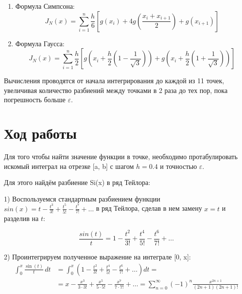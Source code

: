 \documentclass[a4paper,12pt]{article}
\begin{document}
{\begin{enumerate}
{\begin{enumerate}
{\begin{equation}
                \end{equation}
                }
            \item {
                Формула Симпсона:
                \begin{equation}
                    J_N(x) = \displaystyle\sum_{i=1}^{n}\displaystyle\frac{h}{6} \left[g(x_i)+4g\left(
                        \displaystyle\frac{x_i + x_{i+1}}{2}
                    \right) + g(x_{i+1}) \right]
                \end{equation}
                }
            \item {
                Формула Гаусса:
                \begin{equation}
                    J_N(x) = \displaystyle\sum_{i=1}^{n}\displaystyle\frac{h}{2} \left[g\left(
                        x_i + \displaystyle\frac{h}{2}\left(1 - \displaystyle\frac{1}{\sqrt{3}} \right)
                    \right) +
                    g\left(
                        x_i + \displaystyle\frac{h}{2}\left(1 + \displaystyle\frac{1}{\sqrt{3}} \right)
                    \right)
                    \right]
                \end{equation}
                }
        \end{enumerate}
    }
\end{enumerate}

Вычисления проводятся от начала интегрирования до каждой из 11 точек, увели\-чивая количество разбиений между точками в 2 раза до тех пор, пока погрешность больше $\varepsilon$.
\newpage
\section{Ход работы}
\hspace*{1.25cm}Для того чтобы найти значение функции в точке, необходимо протабулировать искомый интеграл на отрезке [a, b] с шагом $h = 0.4$ и точностью $\varepsilon$. 

Для этого найдём разбиение Si(x) в ряд Тейлора: 

1) Воспользуемся стандартным разбиением функции $sin(x) = t - \frac{t^3}{3!} + \frac{t^5}{5!} - \frac{t^7}{7!} + \ldots$ в ряд Тейлора, сделав в нем замену $x = t$ и разделив на $t$:

\begin{equation}
    \frac{sin(t)}{t} = 1 - \frac{t^2}{3!} + \frac{t^4}{5!} - \frac{t^6}{7!} + \ldots
\end{equation}

2) Проинтегрируем полученное выражение на интеграле [0, x]:
\begin{equation}
    \begin{split}
        \int_{0}^{x} \frac{\sin(t)}{t} \, dt &= \int_{0}^{x} \left(1 - \frac{t^2}{3!} + \frac{t^4}{5!} - \frac{t^6}{7!} + \ldots\right) dt = \\
        &= x - \frac{x^3}{3 \cdot 3!} + \frac{x^5}{5 \cdot 5!} - \frac{x^7}{7 \cdot 7!} + \ldots = \sum_{n=0}^{\infty} (-1)^n \frac{x^{2n+1}}{(2n+1) (2n+1)!}
    \end{split}
    \end{equation}
    

}
\end{document}
